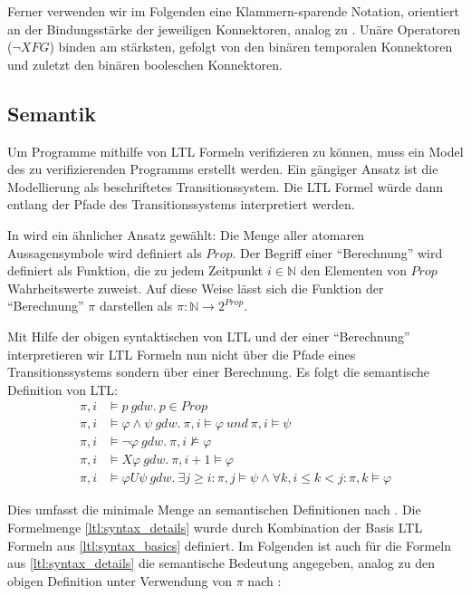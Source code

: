 Ferner verwenden wir im Folgenden eine Klammern-sparende Notation, orientiert an der Bindungsstärke der jeweiligen Konnektoren, analog zu \cite{huth+04}. Unäre Operatoren ($\lnot X F G$) binden am stärksten, gefolgt von den binären temporalen Konnektoren und zuletzt den binären booleschen Konnektoren.


\subsection{Semantik}
\label{ltl:semantik}

Um Programme mithilfe von LTL Formeln verifizieren zu können, muss ein Model des zu verifizierenden Programms erstellt werden. Ein gängiger Ansatz ist die Modellierung als beschriftetes Transitionssystem\cite{huth+04}. Die LTL Formel würde dann entlang der Pfade des Transitionssystems interpretiert werden. 

In \cite{vardi+96} wird ein ähnlicher Ansatz gewählt: Die Menge aller atomaren Aussagensymbole wird definiert als $Prop$. Der Begriff einer "`Berechnung"' wird definiert als Funktion, die zu jedem Zeitpunkt $i \in \mathbb{N}$ den Elementen von $Prop$ Wahrheitswerte zuweist. Auf diese Weise lässt sich die Funktion der "`Berechnung"' $\pi$ darstellen als $\pi : \mathbb{N} \rightarrow 2^{Prop}$. 

Mit Hilfe der obigen syntaktischen von LTL und der einer "`Berechnung"' interpretieren wir LTL Formeln nun nicht über die Pfade eines Transitionssystems sondern über einer Berechnung. Es folgt die semantische Definition von LTL: 
\begin{equation*}
\begin{split}
    \pi, i &\models p\ gdw.\ p \in Prop\\
    \pi, i &\models \varphi \land \psi\ gdw.\ \pi, i \models \varphi\ und\ \pi, i \models \psi\\
    \pi, i &\models \lnot\varphi\ gdw.\ \pi, i \not\models \varphi\\
    \pi, i &\models X\varphi\ gdw.\ \pi, i+1 \models \varphi\\
    \pi, i &\models \varphi U\psi\ gdw.\ \exists j \geq i: \pi, j \models \psi \land \forall k, i\leq k<j: \pi, k \models \varphi
\end{split}
\end{equation*}

Dies umfasst die minimale Menge an semantischen Definitionen nach \cite{vardi+96}. Die Formelmenge \ref{ltl:syntax_details} wurde durch Kombination der Basis LTL Formeln aus \ref{ltl:syntax_basics} definiert. Im Folgenden ist auch für die Formeln aus \ref{ltl:syntax_details} die semantische Bedeutung angegeben, analog zu den obigen Definition unter Verwendung von $\pi$ nach \cite{vardi+96}:

